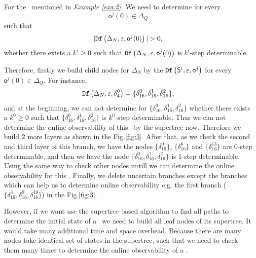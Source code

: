 \begin{example}
For the \BCN\ mentioned in {\em Example \ref{exa:2}}. We need to determine for every \[\mathsf{o}^{j}(0)\in \Delta_Q\] such that \[|\Ded\left(\Delta_N,\varepsilon, \mathsf{o}^{j}(0)\right)|> 0,\] whether there exists a $k^{i}\ge0$ such that ${\tt Df}\left(\Delta_N,\varepsilon,\mathsf{o}^{j}(0)\right)$ is $k^{i}$-step determinable.

Therefore, firstly we build child nodes for $\Delta_N$ by the ${\tt Df}\left(\mathsf{S}^i,\varepsilon, \mathsf{o}^j\right)$ for every $\mathsf{o}^{j}(0)\in \Delta_Q$. For instance, \[{\tt Df}\left(\Delta_N,\varepsilon,\delta_{4}^0\right)=\{\delta_{16}^0,\delta_{16}^1,\delta_{16}^2\},\] and at the beginning, we can not determine for $\{\delta_{16}^0,\delta_{16}^1,\delta_{16}^2\}$ whether there exists a $k^{0}\ge0$ such that $\{\delta_{16}^0,\delta_{16}^1,\delta_{16}^2\}$ is $k^{0}$-step determinable. Thus we can not determine the online observability of this \BCN\ by the supertree now. Therefore we build $2$ more layers as shown in the Fig.\ref{fig:3}. After that, as we check the second and third layer of this branch, we have the nodes $\{\delta_{16}^0\}$, $\{\delta_{16}^6\}$ and $\{\delta_{16}^{13}\}$ are $0$-step determinable, and then we have the node $\{\delta_{16}^0,\delta_{16}^1,\delta_{16}^2\}$ is $1$-step determinable. Using the same way to check other nodes untill we can determine the online observability for this \BCN. Finally, we delete uncertain branches except the branches which can help us to determine online observability e.g. the first branch ($\{\delta_{16}^{3},\delta_{16}^{9},\delta_{16}^{10}\}$) in the Fig.\ref{fig:3}. %
\label{exa:11}
\end{example}   

However, if we want use the supertree-based algorithm to find all paths to determine the initial state of a \BCN\ we need to build all leaf nodes of its supertree. It would take many additional time and space overhead. Because 
 there are many nodes take identical set of states in the supertree, such that we need to check them many times to determine the online observability of a \BCN. 
 
